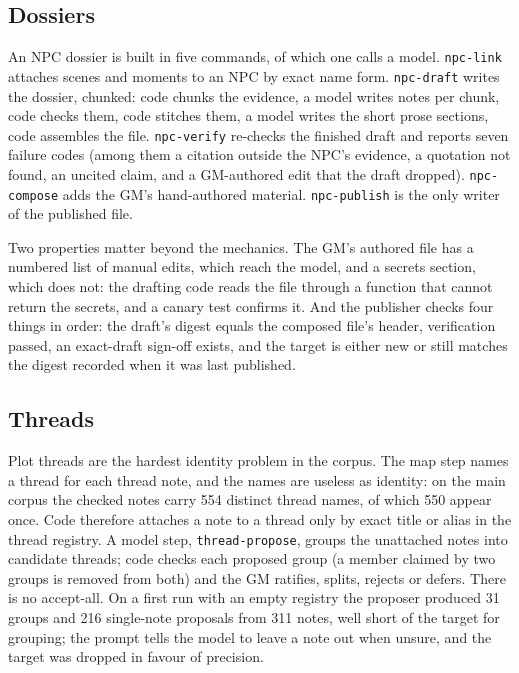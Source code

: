 \documentclass[11pt]{article}
\newcommand{\code}[1]{\texttt{#1}}
\begin{document}
\subsection{Dossiers}

An NPC dossier is built in five commands, of which one calls a model.
\code{npc-link} attaches scenes and moments to an NPC by exact name form.
\code{npc-draft} writes the dossier, chunked: code chunks the evidence, a model writes
notes per chunk, code checks them, code stitches them, a model writes the short prose
sections, code assembles the file. \code{npc-verify} re-checks the finished draft and
reports seven failure codes (among them a citation outside the NPC's evidence, a
quotation not found, an uncited claim, and a GM-authored edit that the draft dropped).
\code{npc-compose} adds the GM's hand-authored material. \code{npc-publish} is the only
writer of the published file.

Two properties matter beyond the mechanics. The GM's authored file has a numbered list
of manual edits, which reach the model, and a secrets section, which does not: the
drafting code reads the file through a function that cannot return the secrets, and a
canary test confirms it. And the publisher checks four things in order: the draft's
digest equals the composed file's header, verification passed, an exact-draft sign-off
exists, and the target is either new or still matches the digest recorded when it was
last published.

\subsection{Threads}

Plot threads are the hardest identity problem in the corpus. The map step names a thread
for each thread note, and the names are useless as identity: on the main corpus the
checked notes carry 554 distinct thread names, of which 550 appear once. Code therefore
attaches a note to a thread only by exact title or alias in the thread registry.
A model step, \code{thread-propose}, groups the unattached notes into candidate threads;
code checks each proposed group (a member claimed by two groups is removed from both)
and the GM ratifies, splits, rejects or defers. There is no accept-all. On a first run
with an empty registry the proposer produced 31 groups and 216 single-note proposals
from 311 notes, well short of the target for grouping; the prompt tells the model to
leave a note out when unsure, and the target was dropped in favour of precision.
\end{document}
